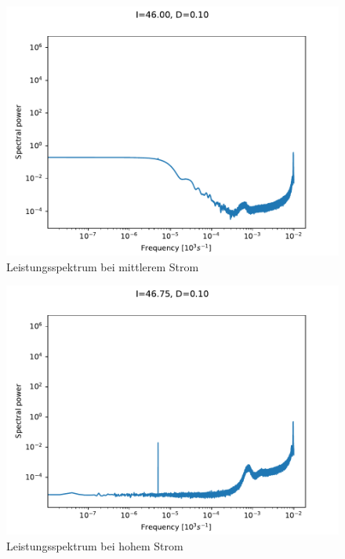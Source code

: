 \documentclass[12pt,a4paper]{article}
\begin{document}
\begin{figure}[H]
	\centering
	\includegraphics[scale=1]{spanhopfd10mittel2.pdf}\caption{Leistungsspektrum bei mittlerem Strom}
	\label{powerspD01mittel2}
\end{figure}
\begin{figure}[H]
	\centering
	\includegraphics[scale=1]{spanhopfd10hoch.pdf}\caption{Leistungsspektrum bei hohem Strom}
	\label{powerspD01hoch}
\end{figure}
\end{document}
